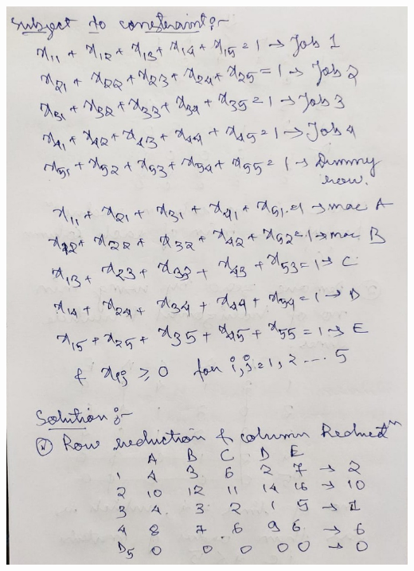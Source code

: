 \documentclass[12pt, letterpaper, twoside]{book}
\begin{document}
\includegraphics[width=\paperwidth, height=\paperheight]{Page3}
\end{document}
